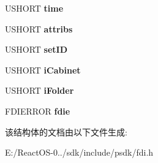 \begin{DoxyCompactItemize}
U\+S\+H\+O\+RT {\bfseries time}
\item 
\mbox{\label{struct_f_d_i_n_o_t_i_f_i_c_a_t_i_o_n_af172b8ff715e2fb204a9c9b35b3b1766}} 
U\+S\+H\+O\+RT {\bfseries attribs}
\item 
\mbox{\label{struct_f_d_i_n_o_t_i_f_i_c_a_t_i_o_n_a0880425b8a8d3b6fac842c3d61fb284c}} 
U\+S\+H\+O\+RT {\bfseries set\+ID}
\item 
\mbox{\label{struct_f_d_i_n_o_t_i_f_i_c_a_t_i_o_n_a0e03150f44a02803e78c95a72f32aa4e}} 
U\+S\+H\+O\+RT {\bfseries i\+Cabinet}
\item 
\mbox{\label{struct_f_d_i_n_o_t_i_f_i_c_a_t_i_o_n_a701abf0532454c19640db45f1186fcdf}} 
U\+S\+H\+O\+RT {\bfseries i\+Folder}
\item 
\mbox{\label{struct_f_d_i_n_o_t_i_f_i_c_a_t_i_o_n_a938f1fdfcf3b6c59bf82571855f3ddb4}} 
F\+D\+I\+E\+R\+R\+OR {\bfseries fdie}
\end{DoxyCompactItemize}


该结构体的文档由以下文件生成\+:\begin{DoxyCompactItemize}
\item 
E\+:/\+React\+O\+S-\/0../sdk/include/psdk/fdi.\+h\end{DoxyCompactItemize}
